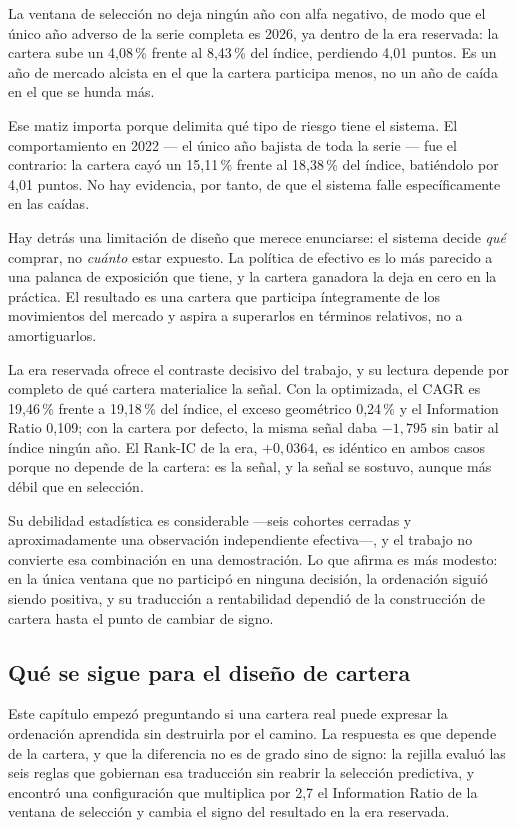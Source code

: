 La ventana de selección no deja ningún año con alfa negativo, de modo que el único año adverso de la
serie completa es 2026, ya dentro de la era reservada: la cartera sube un 4,08\,\% frente al
8,43\,\% del índice, perdiendo 4,01 puntos. Es un año de mercado alcista en el que la cartera
participa menos, no un año de caída en el que se hunda más.

Ese matiz importa porque delimita qué tipo de riesgo tiene el sistema. El comportamiento en 2022
--- el único año bajista de toda la serie --- fue el contrario: la cartera cayó un 15,11\,\% frente
al 18,38\,\% del índice, batiéndolo por 4,01 puntos. No hay evidencia, por tanto, de que el sistema
falle específicamente en las caídas.

Hay detrás una limitación de diseño que merece enunciarse: el sistema decide \emph{qué} comprar, no
\emph{cuánto} estar expuesto. La política de efectivo es lo más parecido a una palanca de exposición
que tiene, y la cartera ganadora la deja en cero en la práctica. El resultado es una cartera que
participa íntegramente de los movimientos del mercado y aspira a superarlos en términos relativos,
no a amortiguarlos.

La era reservada ofrece el contraste decisivo del trabajo, y su lectura depende por completo de qué
cartera materialice la señal. Con la optimizada, el CAGR es 19,46\,\% frente a 19,18\,\% del índice,
el exceso geométrico 0,24\,\% y el Information Ratio 0,109; con la cartera por defecto, la misma
señal daba $-1{,}795$ sin batir al índice ningún año. El Rank-IC de la era, $+0{,}0364$, es idéntico
en ambos casos porque no depende de la cartera: es la señal, y la señal se sostuvo, aunque más débil
que en selección.

Su debilidad estadística es considerable ---seis cohortes cerradas y aproximadamente una observación
independiente efectiva---, y el trabajo no convierte esa combinación en una demostración. Lo que
afirma es más modesto: en la única ventana que no participó en ninguna decisión, la ordenación
siguió siendo positiva, y su traducción a rentabilidad dependió de la construcción de cartera hasta
el punto de cambiar de signo.

\subsection{Qué se sigue para el diseño de cartera}

Este capítulo empezó preguntando si una cartera real puede expresar la ordenación aprendida sin
destruirla por el camino. La respuesta es que depende de la cartera, y que la diferencia no es de
grado sino de signo: la rejilla evaluó las seis reglas que gobiernan esa traducción sin reabrir la
selección predictiva, y encontró una configuración que multiplica por 2,7 el Information Ratio de la
ventana de selección y cambia el signo del resultado en la era reservada.

